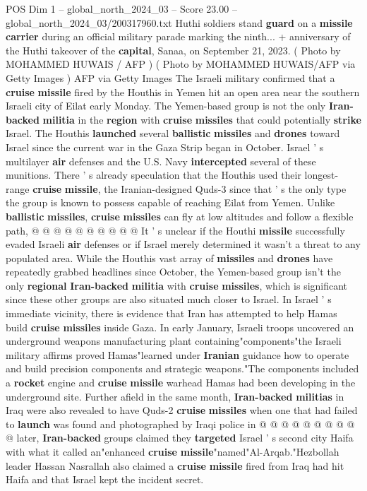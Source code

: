 \begin{textsample}{POS Dim 1 – global\_north\_2024\_03 – Score 23.00 – global\_north\_2024\_03/200317960.txt}  \label{ex:f1_pos_381}
Huthi soldiers stand \textbf{guard} on a \textbf{missile} \textbf{carrier} during an official military parade marking the ninth... + anniversary of the Huthi takeover of the \textbf{capital}, Sanaa, on September 21, 2023. ( Photo by MOHAMMED HUWAIS / AFP ) ( Photo by MOHAMMED HUWAIS/AFP via Getty Images ) AFP via Getty Images The Israeli military confirmed that a \textbf{cruise} \textbf{missile} fired by the Houthis in Yemen hit an open area near the southern Israeli city of Eilat early Monday.
The Yemen-based group is not the only \textbf{Iran-backed} \textbf{militia} in the \textbf{region} with \textbf{cruise} \textbf{missiles} that could potentially \textbf{strike} Israel.
The Houthis \textbf{launched} several \textbf{ballistic} \textbf{missiles} and \textbf{drones} toward Israel since the current war in the Gaza Strip began in October.
Israel ' s multilayer \textbf{air} defenses and the U.S.
Navy \textbf{intercepted} several of these munitions.
There ' s already speculation that the Houthis used their longest-range \textbf{cruise} \textbf{missile}, the Iranian-designed Quds-3 since that ' s the only type the group is known to possess capable of reaching Eilat from Yemen.
Unlike \textbf{ballistic} \textbf{missiles}, \textbf{cruise} \textbf{missiles} can fly at low altitudes and follow a flexible path, @ @ @ @ @ @ @ @ @ @ It ' s unclear if the Houthi \textbf{missile} successfully evaded Israeli \textbf{air} defenses or if Israel merely determined it wasn't a threat to any populated area.
While the Houthis vast array of \textbf{missiles} and \textbf{drones} have repeatedly grabbed headlines since October, the Yemen-based group isn't the only \textbf{regional} \textbf{Iran-backed} \textbf{militia} with \textbf{cruise} \textbf{missiles}, which is significant since these other groups are also situated much closer to Israel.
In Israel ' s immediate vicinity, there is evidence that Iran has attempted to help Hamas build \textbf{cruise} \textbf{missiles} inside Gaza.
In early January, Israeli troops uncovered an underground weapons manufacturing plant containing"components"the Israeli military affirms proved Hamas"learned under \textbf{Iranian} guidance how to operate and build precision components and strategic weapons."The components included a \textbf{rocket} engine and \textbf{cruise} \textbf{missile} warhead Hamas had been developing in the underground site.
Further afield in the same month, \textbf{Iran-backed} \textbf{militias} in Iraq were also revealed to have Quds-2 \textbf{cruise} \textbf{missiles} when one that had failed to \textbf{launch} was found and photographed by Iraqi police in @ @ @ @ @ @ @ @ @ @ later, \textbf{Iran-backed} groups claimed they \textbf{targeted} Israel ' s second city Haifa with what it called an"enhanced \textbf{cruise} \textbf{missile}"named"Al-Arqab."Hezbollah leader Hassan Nasrallah also claimed a \textbf{cruise} \textbf{missile} fired from Iraq had hit Haifa and that Israel kept the incident secret.

\end{textsample}
